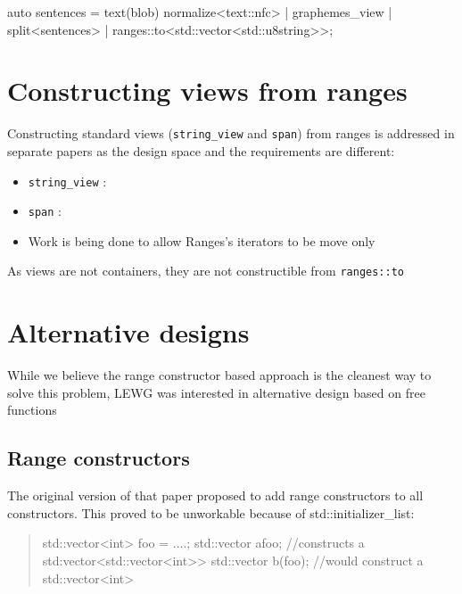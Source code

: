 \documentclass{wg21}
\newcommand{\cc}[1]{\texttt{#1}}
\begin{document}
\begin{codeblock}
    auto sentences =
        text(blob)
        normalize<text::nfc> |
        graphemes_view |
        split<sentences> | ranges::to<std::vector<std::u8string>>;
\end{codeblock}



\section{Constructing views from ranges}

Constructing standard views (\cc{string_view} and \cc{span}) from ranges is addressed in separate papers as
the design space and the requirements are different:

\begin{itemize}
	\item \cc{string_view} : \cite{P1391}
	\item  \cc{span}       : \cite{P1394}
	\item Work is being done to allow Ranges's iterators to be move only
\end{itemize}

As views are not containers, they are not constructible from \cc{ranges::to}  


\section{Alternative designs}

While we believe the range constructor based approach is the cleanest way to solve this problem,
LEWG was interested in alternative design based on free functions

\subsection{Range constructors}

The original version of that paper proposed to add range constructors to all constructors.
This proved to be unworkable because of std::initializer_list:

\begin{quote}
	\begin{codeblock}
		std::vector<int> foo = ....;
		std::vector a{foo}; //constructs a std:vector<std::vector<int>>
		std::vector b(foo); //would construct a std::vector<int>
	\end{codeblock}
\end{quote}
\end{document}
